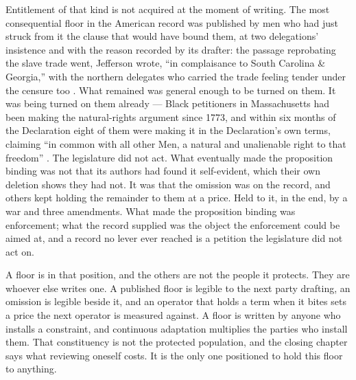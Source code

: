 Entitlement of that kind is not acquired at the moment of writing. The most consequential floor in the American record was published by men who had just struck from it the clause that would have bound them, at two delegations' insistence and with the reason recorded by its drafter: the passage reprobating the slave trade went, Jefferson wrote, “in complaisance to South Carolina \& Georgia,” with the northern delegates who carried the trade feeling tender under the censure too \autocite{loc2010declaration}. What remained was general enough to be turned on them. It was being turned on them already — Black petitioners in Massachusetts had been making the natural-rights argument since 1773, and within six months of the Declaration eight of them were making it in the Declaration's own terms, claiming “in common with all other Men, a natural and unalienable right to that freedom” \autocite{hall1777petition}. The legislature did not act. What eventually made the proposition binding was not that its authors had found it self-evident, which their own deletion shows they had not. It was that the omission was on the record, and others kept holding the remainder to them at a price. Held to it, in the end, by a war and three amendments. What made the proposition binding was enforcement; what the record supplied was the object the enforcement could be aimed at, and a record no lever ever reached is a petition the legislature did not act on.

A floor is in that position, and the others are not the people it protects. They are whoever else writes one. A published floor is legible to the next party drafting, an omission is legible beside it, and an operator that holds a term when it bites sets a price the next operator is measured against. A floor is written by anyone who installs a constraint, and continuous adaptation multiplies the parties who install them. That constituency is not the protected population, and the closing chapter says what reviewing oneself costs. It is the only one positioned to hold this floor to anything.
